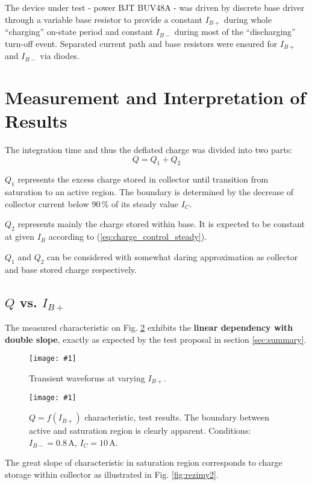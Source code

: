 \documentclass[conference]{IEEEtran}
\newcommand{\un}[1]{\, \mathrm{#1}}	%
\newcommand{\myfigsc}[3]
{
    \begin{figure}[!ht]
	\centering
	\texttt{[image: \#1]}
	\caption{#2}
	#3
    \end{figure}
}
\begin{document}
The device under test - power BJT BUV48A - was driven by discrete base driver through a variable base resistor to provide a constant $I_{B+}$ during whole ``charging'' on-state period and constant $I_{B-}$ during most of the ``discharging'' turn-off event. Separated current path and base resistors were ensured for $I_{B+}$ and $I_{B-}$ via diodes.

\section{Measurement and Interpretation of Results} \label{sec:results}

The integration time and thus the deflated charge was divided into two parts:
\begin{equation}
    Q = Q_1 + Q_2
    \label{eq:Q1_Q2}
\end{equation}

$Q_1$ represents the excess charge stored in collector until transition from saturation to an active region.
The boundary is determined by the decrease of collector current below $90\un{\%}$ of its steady value $I_C$.

$Q_2$ represents mainly the charge stored within base. It is expected to be constant at given $I_B$ according to (\ref{eq:charge_control_steady}).

$Q_1$ and $Q_2$ can be considered with somewhat daring approximation as collector and base stored charge respectively.


\subsection{$Q$ vs. $I_{B+}$}
The measured characteristic on Fig. \ref{fig:QvsIbpos} exhibits the \textbf{linear dependency with double slope}, exactly as expected by the test proposal in section \ref{sec:summary}.
\myfigsc{QvsIbpos_tr3_prieb}{Transient waveforms at varying $I_{B+}$.}{\label{fig:QvsIbpos_prieb}}
\myfigsc{QvsIbpos_tr1}{$Q=f(I_{B+})$ characteristic, test results. The boundary between active and saturation region is clearly apparent. Conditions: $I_{B-}=0.8\un{A}$, $I_C=10\un{A}$.}{\label{fig:QvsIbpos}}

The great slope of characteristic in saturation region corresponds to charge storage within collector as illustrated in Fig. \ref{fig:rezimy2}.
\end{document}
